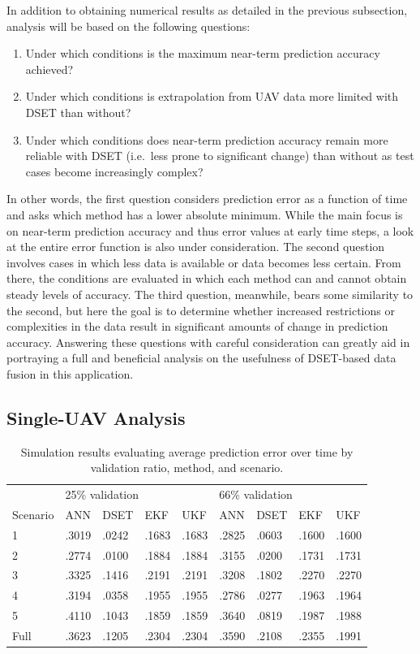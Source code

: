 \documentclass[12pt]{uthesis-v12}  %
\begin{document}
In addition to obtaining numerical results as detailed in the previous subsection, analysis will be based on the following questions:
\begin{enumerate}
\item Under which conditions is the maximum near-term prediction accuracy achieved?
\item Under which conditions is extrapolation from UAV data more limited with DSET than without?
\item Under which conditions does near-term prediction accuracy remain more reliable with DSET (i.e.~less prone to significant change) than without as test cases become increasingly complex? 
\end{enumerate}
In other words, the first question considers prediction error as a function of time and asks which method has a lower absolute minimum. While the main focus is on near-term prediction accuracy and thus error values at early time steps, a look at the entire error function is also under consideration. The second question involves cases in which less data is available or data becomes less certain. From there, the conditions are evaluated in which each method can and cannot obtain steady levels of accuracy. The third question, meanwhile, bears some similarity to the second, but here the goal is to determine whether increased restrictions or complexities in the data result in significant amounts of change in prediction accuracy.
Answering these questions with careful consideration can greatly aid in portraying a full and beneficial analysis on the usefulness of DSET-based data fusion in this application.
		
\subsection{Single-UAV Analysis}
\label{one-uav}

\begin{table}[!t]
\caption{Simulation results evaluating average prediction error over time by validation ratio, method, and scenario.}
\renewcommand{\arraystretch}{1.3}
\centering
{\begin{tabular}{*{9}{l}}
\toprule
& \multicolumn{4}{l}{25\% validation} & \multicolumn{4}{l}{66\% validation} \\
Scenario & ANN & DSET & EKF & UKF & ANN & DSET & EKF & UKF \\ \midrule
1 & .3019 & .0242 & .1683 & .1683 & .2825 & .0603 & .1600 & .1600 \\
2 & .2774 & .0100 & .1884 & .1884 & .3155 & .0200 & .1731 & .1731 \\
3 & .3325 & .1416 & .2191 & .2191 & .3208 & .1802 & .2270 & .2270 \\
4 & .3194 & .0358 & .1955 & .1955 & .2786 & .0277 & .1963 & .1964 \\
5 & .4110 & .1043 & .1859 & .1859 & .3640 & .0819 & .1987 & .1988 \\
Full & .3623 & .1205 & .2304 & .2304 & .3590 & .2108 & .2355 & .1991 \\ \bottomrule
\end{tabular}}

\label{val-single}
\end{table}
\end{document}
